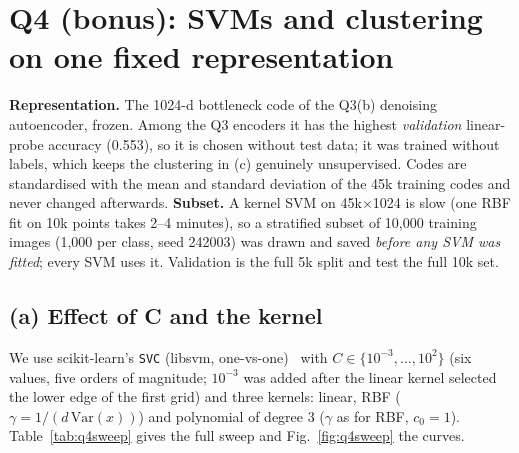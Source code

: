 \section{Q4 (bonus): SVMs and clustering on one fixed representation}
\label{sec:q4}

\textbf{Representation.} The 1024-d bottleneck code of the Q3(b) denoising autoencoder, frozen. Among the Q3
encoders it has the highest \emph{validation} linear-probe accuracy (0.553), so it is chosen without test
data; it was trained without labels, which keeps the clustering in (c) genuinely unsupervised. Codes are
standardised with the mean and standard deviation of the 45k training codes and never changed afterwards.
\textbf{Subset.} A kernel SVM on 45k$\times$1024 is slow (one RBF fit on 10k points takes 2--4 minutes), so a
stratified subset of 10{,}000 training images (1{,}000 per class, seed 242003) was drawn and saved
\emph{before any SVM was fitted}; every SVM uses it. Validation is the full 5k split and test the full 10k set.

\subsection{(a) Effect of C and the kernel}
We use scikit-learn's \texttt{SVC} (libsvm, one-vs-one)~\cite{cortes1995support,pedregosa2011scikit} with
$C\in\{10^{-3},\dots,10^{2}\}$ (six values, five orders of magnitude; $10^{-3}$ was added after the linear kernel
selected the lower edge of the first grid) and three kernels: linear, RBF ($\gamma=1/(d\,\mathrm{Var}(x))$) and
polynomial of degree 3 ($\gamma$ as for RBF, $c_0=1$). Table~\ref{tab:q4sweep} gives the full sweep and
Fig.~\ref{fig:q4sweep} the curves.

